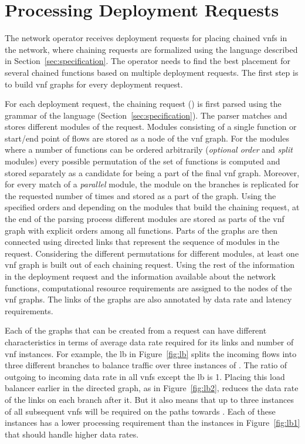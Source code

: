 \documentclass[10pt,a4paper,conference]{IEEEtran}
\begin{document}
\section{Processing Deployment Requests}
\label{sec:transformation}

The network operator receives deployment requests for placing chained \acp{vnf}
in the network, where chaining requests are formalized using the language described in 
Section~\ref{sec:specification}. The operator needs to find the best placement for several
chained functions based on multiple deployment requests. The first step is to build
\ac{vnf} graphs for every deployment request.

For each deployment request, the chaining request () is first parsed using 
the grammar of the language (Section~\ref{sec:specification}). The parser 
matches and stores different modules of the request. Modules consisting of a single
function or start/end point of flows are stored as a node of the \ac{vnf} graph. 
For the modules where a number of functions can be ordered arbitrarily (\emph{optional order} and 
\emph{split} modules) every possible permutation of the set of functions is computed
and stored separately as a candidate for being a part of the final \ac{vnf} graph.
Moreover, for every match of a \emph{parallel} module, the module on 
the branches is replicated for the requested number of times and stored as a part
of the graph. Using the specified orders and depending on the modules that build 
the chaining request, at the end of the parsing process different modules are stored
as parts of the \ac{vnf} graph with explicit orders among all functions. Parts
of the graphs are then connected using directed links that represent the sequence 
of modules in the request. Considering the different permutations for different 
modules, at least one \ac{vnf} graph is built out of each chaining request. 
Using the rest of the information in the deployment request and the information 
available about the network functions, computational resource requirements are 
assigned to the nodes of the \ac{vnf} graphs. The links of the graphs are also
annotated by data rate and latency requirements. 

Each of the graphs that can be created from a request can have different characteristics 
in terms of average data rate required for its links and number of \ac{vnf} instances. 
For example, the \ac{lb} in Figure~\ref{fig:lb} splits the incoming flows into 
three different branches to balance 
traffic over three instances of . The ratio of outgoing to incoming data 
rate in all \acp{vnf} except the \ac{lb} is 1. Placing this load balancer earlier in
the directed graph, as in Figure~\ref{fig:lb2}, reduces the data rate of the 
links on each branch after it. But it also means that up to three instances of
all subsequent \acp{vnf} will be required on the paths towards . Each of
these instances has a lower processing requirement than the instances
in Figure~\ref{fig:lb1} that should handle higher data rates.
\end{document}
